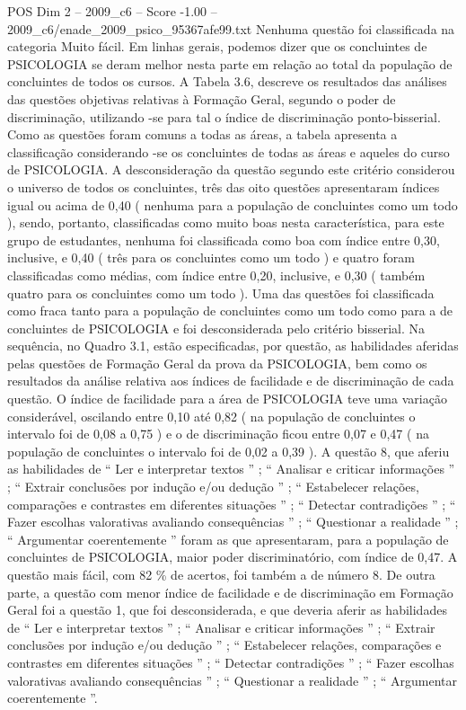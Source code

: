 \begin{textsample}{POS Dim 2 – 2009\_c6 – Score -1.00 – 2009\_c6/enade\_2009\_psico\_95367afe99.txt}
Nenhuma questão foi classificada na categoria Muito fácil.
Em linhas gerais, podemos dizer que os concluintes de PSICOLOGIA se deram melhor nesta parte em relação ao total da população de concluintes de todos os cursos.
A Tabela 3.6, descreve os resultados das análises das questões objetivas relativas à Formação Geral, segundo o poder de discriminação, utilizando -se para tal o índice de discriminação ponto-bisserial.
Como as questões foram comuns a todas as áreas, a tabela apresenta a classificação considerando -se os concluintes de todas as áreas e aqueles do curso de PSICOLOGIA.
A desconsideração da questão segundo este critério considerou o universo de todos os concluintes, três das oito questões apresentaram índices igual ou acima de 0,40 ( nenhuma para a população de concluintes como um todo ), sendo, portanto, classificadas como muito boas nesta característica, para este grupo de estudantes, nenhuma foi classificada como boa com índice entre 0,30, inclusive, e 0,40 ( três para os concluintes como um todo ) e quatro foram classificadas como médias, com índice entre 0,20, inclusive, e 0,30 ( também quatro para os concluintes como um todo ).
Uma das questões foi classificada como fraca tanto para a população de concluintes como um todo como para a de concluintes de PSICOLOGIA e foi desconsiderada pelo critério bisserial.
Na sequência, no Quadro 3.1, estão especificadas, por questão, as habilidades aferidas pelas questões de Formação Geral da prova da PSICOLOGIA, bem como os resultados da análise relativa aos índices de facilidade e de discriminação de cada questão.
O índice de facilidade para a área de PSICOLOGIA teve uma variação considerável, oscilando entre 0,10 até 0,82 ( na população de concluintes o intervalo foi de 0,08 a 0,75 ) e o de discriminação ficou entre 0,07 e 0,47 ( na população de concluintes o intervalo foi de 0,02 a 0,39 ).
A questão 8, que aferiu as habilidades de “ Ler e interpretar textos ” ; “ Analisar e criticar informações ” ; “ Extrair conclusões por indução e/ou dedução ” ; “ Estabelecer relações, comparações e contrastes em diferentes situações ” ; “ Detectar contradições ” ; “ Fazer escolhas valorativas avaliando consequências ” ; “ Questionar a realidade ” ; “ Argumentar coerentemente ” foram as que apresentaram, para a população de concluintes de PSICOLOGIA, maior poder discriminatório, com índice de 0,47.
A questão mais fácil, com 82 \% de acertos, foi também a de número 8.
De outra parte, a questão com menor índice de facilidade e de discriminação em Formação Geral foi a questão 1, que foi desconsiderada, e que deveria aferir as habilidades de “ Ler e interpretar textos ” ; “ Analisar e criticar informações ” ; “ Extrair conclusões por indução e/ou dedução ” ; “ Estabelecer relações, comparações e contrastes em diferentes situações ” ; “ Detectar contradições ” ; “ Fazer escolhas valorativas avaliando consequências ” ; “ Questionar a realidade ” ; “ Argumentar coerentemente ”.

\end{textsample}
